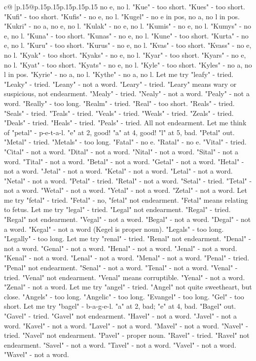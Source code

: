 \documentclass{article}
\begin{document}
{\begin{supertabular}{c@{$\;$}|p{.15\linewidth}@{}p{.15\linewidth}p{.15\linewidth}p{.15\linewidth}p{.15\linewidth}p{.15\linewidth}}
{{{no e, no l. "Kue" {-} too short. "Kues" {-} too short. "Kufi" {-} too short. "Kufis" {-} no e, no l. "Kugel" {-} no e in pos, no a, no l in pos. "Kukri" {-} no a, no e, no l. "Kulak" {-} no e, no l. "Kumis" {-} no e, no l. "Kumys" {-} no e, no l. "Kuna" {-} too short. "Kunas" {-} no e, no l. "Kune" {-} too short. "Kurta" {-} no e, no l. "Kuru" {-} too short. "Kurus" {-} no e, no l. "Kvas" {-} too short. "Kvass" {-} no e, no l. "Kyak" {-} too short. "Kyaks" {-} no e, no l. "Kyar" {-} too short. "Kyars" {-} no e, no l. "Kyat" {-} too short. "Kyats" {-} no e, no l. "Kyle" {-} too short. "Kyles" {-} no a, no l in pos. "Kyrie" {-} no a, no l. "Kythe" {-} no a, no l. Let me try "leafy" {-} tried. "Leaky" {-} tried. "Leany" {-} not a word. "Leary" {-} tried. "Leary" means wary or suspicious, not endearment. "Mealy" {-} tried. "Nealy" {-} not a word. "Pealy" {-} not a word. "Really" {-} too long. "Realm" {-} tried. "Real" {-} too short. "Reals" {-} tried. "Seals" {-} tried. "Teals" {-} tried. "Veals" {-} tried. "Weals" {-} tried. "Zeals" {-} tried. "Deals" {-} tried. "Heals" {-} tried. "Peals" {-} tried. All not endearment. Let me think of "petal" {-} p{-}e{-}t{-}a{-}l. "e" at 2, good! "a" at 4, good! "l" at 5, bad. "Petal" out. "Metal" {-} tried. "Metals" {-} too long. "Fatal" {-} no e. "Ratal" {-} no e. "Vital" {-} tried. "Cital" {-} not a word. "Dital" {-} not a word. "Nital" {-} not a word. "Sital" {-} not a word. "Tital" {-} not a word. "Betal" {-} not a word. "Getal" {-} not a word. "Hetal" {-} not a word. "Jetal" {-} not a word. "Ketal" {-} not a word. "Letal" {-} not a word. "Netal" {-} not a word. "Petal" {-} tried. "Retal" {-} not a word. "Setal" {-} tried. "Tetal" {-} not a word. "Wetal" {-} not a word. "Yetal" {-} not a word. "Zetal" {-} not a word. Let me try "fetal" {-} tried. "Fetal" {-} no, "fetal" not endearment. "Fetal" means relating to fetus. Let me try "legal" {-} tried. "Legal" not endearment. "Regal" {-} tried. "Regal" not endearment. "Vegal" {-} not a word. "Begal" {-} not a word. "Degal" {-} not a word. "Kegal" {-} not a word (Kegel is proper noun). "Legals" {-} too long. "Legally" {-} too long. Let me try "renal" {-} tried. "Renal" not endearment. "Denal" {-} not a word. "Genal" {-} not a word. "Henal" {-} not a word. "Jenal" {-} not a word. "Kenal" {-} not a word. "Lenal" {-} not a word. "Menal" {-} not a word. "Penal" {-} tried. "Penal" not endearment. "Senal" {-} not a word. "Tenal" {-} not a word. "Venal" {-} tried. "Venal" not endearment. "Venal" means corruptible. "Yenal" {-} not a word. "Zenal" {-} not a word. Let me try "angel" {-} tried. "Angel" not quite sweetheart, but close. "Angels" {-} too long. "Angelic" {-} too long. "Evangel" {-} too long. "Gel" {-} too short. Let me try "bagel" {-} b{-}a{-}g{-}e{-}l. "a" at 2, bad; "e" at 4, bad. "Bagel" out. "Gavel" {-} tried. "Gavel" not endearment. "Havel" {-} not a word. "Javel" {-} not a word. "Kavel" {-} not a word. "Lavel" {-} not a word. "Mavel" {-} not a word. "Navel" {-} tried. "Navel" not endearment. "Pavel" {-} proper noun. "Ravel" {-} tried. "Ravel" not endearment. "Savel" {-} not a word. "Tavel" {-} not a word. "Vavel" {-} not a word. "Wavel" {-} not a word. }}}
\end{supertabular}}
\end{document}
